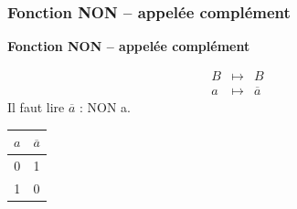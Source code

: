 \documentclass[11pt,oneside]{article}
\begin{document}
\subsubsection{Fonction NON -- appelée complément}
\begin{defi}
\textbf{Fonction NON -- appelée complément}

\begin{minipage}[c]{.45\linewidth}
\begin{eqnarray*}
B &\longmapsto& B\\
a &\longmapsto& \overline{a}
\end{eqnarray*}
Il faut lire $\overline{a}$ : NON a.
\end{minipage} \hfill
\begin{minipage}[c]{.45\linewidth}
\begin{center}
\begin{tabular}{|c||c|}
\hline
$a$ & $\overline{a}$ \\
\hline
0 & 1 \\
\hline
1 & 0 \\
\hline
\end{tabular}
\end{center}
\end{minipage}
\end{defi}
\end{document}
